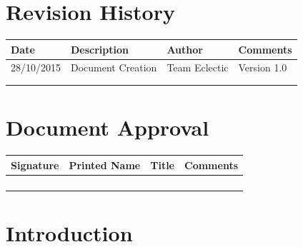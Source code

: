 \documentclass[11pt]{article}
\begin{document}


\setcounter{tocdepth}{3}
\setcounter{secnumdepth}{3}
\tableofcontents

\newpage
\section{Revision History}
\begin{table}[h]
\begin{tabular}{llll}
\textbf{Date}          & \textbf{Description}  & \textbf{Author}       & \textbf{Comments}   \\ \hline
\multicolumn{1}{|R{2cm}|}{28/10/2015} & \multicolumn{1}{L{4.5cm}|}{Document Creation} & \multicolumn{1}{l|}{Team Eclectic} & \multicolumn{1}{L{4cm}|}{Version 1.0} \\ \hline
\multicolumn{1}{|l|}{} & \multicolumn{1}{l|}{} & \multicolumn{1}{l|}{} & \multicolumn{1}{l|}{} \\ \hline
\multicolumn{1}{|l|}{} & \multicolumn{1}{l|}{} & \multicolumn{1}{l|}{} & \multicolumn{1}{l|}{} \\ \hline

\end{tabular}
\end{table}

\section{Document Approval}
\begin{table}[h]
\begin{tabular}{llll}
\textbf{Signature}     & \textbf{Printed Name} & \textbf{Title}        & \textbf{Comments}     \\ \hline
\multicolumn{1}{|l|}{} & \multicolumn{1}{L{3.5cm}|}{} & \multicolumn{1}{L{3.5cm}|}{} & \multicolumn{1}{L{4cm}|}{} \\ \hline
\multicolumn{1}{|l|}{} & \multicolumn{1}{l|}{} & \multicolumn{1}{l|}{} & \multicolumn{1}{l|}{} \\ \hline
\multicolumn{1}{|l|}{} & \multicolumn{1}{l|}{} & \multicolumn{1}{l|}{} & \multicolumn{1}{l|}{} \\ \hline
\multicolumn{1}{|l|}{} & \multicolumn{1}{l|}{} & \multicolumn{1}{l|}{} & \multicolumn{1}{l|}{} \\ \hline
\end{tabular}
\end{table}

\newpage

\section{Introduction}
\end{document}
